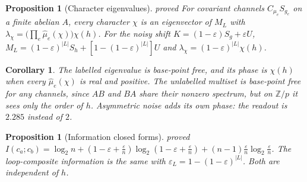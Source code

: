 \documentclass[11pt]{article}
\newtheorem{proposition}[theorem]{Proposition}
\newtheorem{corollary}[theorem]{Corollary}
\theoremstyle{definition}
\theoremstyle{remark}
\newcommand{\Z}{\mathbb{Z}}
\newcommand{\st}[1]{\textsf{\small\color{gray}#1}}
\begin{document}
\begin{proposition}[Character eigenvalues]\label{prop:eig}\st{proved}
For covariant channels $C_{\mu_e}S_{g_e}$ on a finite abelian $A$, every character $\chi$ is an eigenvector of $M_L$ with $\lambda_\chi=\big(\prod_e\hat\mu_e(\chi)\big)\chi(h)$. For the noisy shift $K=(1-\varepsilon)S_g+\varepsilon U$, $M_L=(1-\varepsilon)^{|L|}S_h+[1-(1-\varepsilon)^{|L|}]U$ and $\lambda_\chi=(1-\varepsilon)^{|L|}\chi(h)$.
\end{proposition}
\begin{corollary}\label{res:auto12}
The labelled eigenvalue is base-point free, and its phase is $\chi(h)$ when every $\hat\mu_e(\chi)$ is real and positive. The unlabelled multiset is base-point free for \emph{any} channels, since $AB$ and $BA$ share their nonzero spectrum, but on $\Z/p$ it sees only the order of $h$. Asymmetric noise adds its own phase: the readout is $2.285$ instead of $2$.
\end{corollary}
\begin{proposition}[Information closed forms]\label{res:auto13}\st{proved}
$I(c_a;c_b)=\log_2n+(1-\varepsilon+\tfrac\varepsilon n)\log_2(1-\varepsilon+\tfrac\varepsilon n)+(n-1)\tfrac\varepsilon n\log_2\tfrac\varepsilon n$. The loop-composite information is the same with $\varepsilon_L=1-(1-\varepsilon)^{|L|}$. Both are independent of $h$.
\end{proposition}
\end{document}
